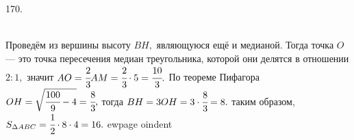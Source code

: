 170. \begin{figure}[ht!]
\end{figure}\\
Проведём из вершины высоту $BH,$ являющуюся ещё и медианой. Тогда точка $O$ --- это точка пересечения медиан треугольника, которой они делятся в отношении $2:1,$ значит $AO=\cfrac{2}{3}AM=\cfrac{2}{3}\cdot5=\cfrac{10}{3}.$ По теореме Пифагора $OH=\sqrt{\cfrac{100}{9}-4}=\cfrac{8}{3},$ тогда $BH=3OH=3\cdot\cfrac{8}{3}=8.$ таким образом, $S_{\Delta ABC}=\cfrac{1}{2}\cdot8\cdot4=16.$
ewpage
oindent
